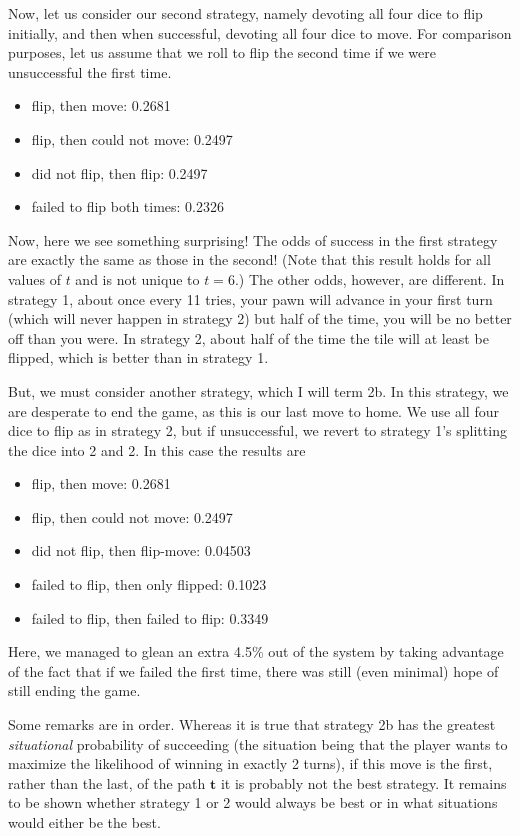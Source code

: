 \documentclass[letterpaper]{article}
\begin{document}
Now, let us consider our second strategy, namely devoting all four dice to
flip initially, and then when successful, devoting all four dice to move.  For
comparison purposes, let us assume that we roll to flip the second time if we
were unsuccessful the first time.
\begin{itemize}
\item flip, then move: 0.2681
\item flip, then could not move: 0.2497
\item did not flip, then flip: 0.2497
\item failed to flip both times: 0.2326
\end{itemize}
Now, here we see something surprising!  The odds of success in the first
strategy are exactly the same as those in the second!  (Note that this result
holds for all values of $t$ and is not unique to $t=6$.)  The other odds,
however, are different.  In strategy 1, about once every 11 tries, your pawn
will advance in your first turn (which will never happen in strategy 2) but
half of the time, you will be no better off than you were.  In strategy 2,
about half of the time the tile will at least be flipped, which is better than
in strategy 1.

But, we must consider another strategy, which I will term 2b.  In this strategy,
we are desperate to end the game, as this is our last move to home.  We use
all four dice to flip as in strategy 2, but if unsuccessful, we revert to
strategy 1's splitting the dice into 2 and 2.  In this case the results are
\begin{itemize}
\item flip, then move: 0.2681
\item flip, then could not move: 0.2497
\item did not flip, then flip-move: 0.04503
\item failed to flip, then only flipped: 0.1023
\item failed to flip, then failed to flip: 0.3349
\end{itemize}
Here, we managed to glean an extra 4.5\% out of the system by taking advantage
of the fact that if we failed the first time, there was still (even minimal)
hope of still ending the game.

Some remarks are in order.  Whereas it is true that strategy 2b has the greatest
\textit{situational} probability of succeeding (the situation being that the 
player wants to maximize the likelihood of winning in exactly 2 turns), if this
move is the first, rather than the last, of the path $\mathbf{t}$ it is probably
not the best strategy.  It remains to be shown whether strategy 1 or 2 would 
always be best or in what situations would either be the best.
\end{document}
